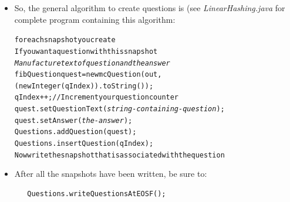 \documentclass[12pt]{article}
\begin{document}
\begin{itemize}
\begin{verbatim}
\end{verbatim}
\normalsize
\item So, the general algorithm to create questions is (see
  \textit{LinearHashing.java} for complete program containing this
  algorithm:

\small
\begin{alltt}
for each snapshot you create
  If you want a question with this snapshot
     \textit{Manufacture text of question and the answer}
     fibQuestion quest = new mcQuestion(out, (new Integer(qIndex)).toString());
     qIndex++;  // Increment your question counter
     quest.setQuestionText(\textit{string-containing-question});
     quest.setAnswer(\textit{the-answer});
     Questions.addQuestion(quest);
     Questions.insertQuestion(qIndex);
  Now write the snapshot that is associated with the question
\end{alltt}
\normalsize
\item After all the snapshots have been written, be sure to:

\small
\begin{verbatim}
   Questions.writeQuestionsAtEOSF();
\end{verbatim}
\end{itemize}
\end{document}
